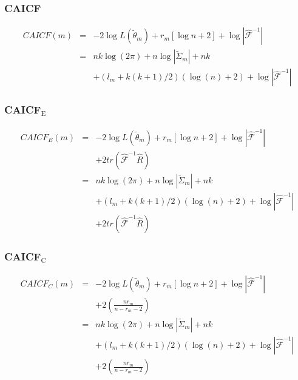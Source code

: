 \subsubsection{CAICF}

\begin{eqnarray*}
CAICF\left(m\right) & = & -2\log L\left(\widetilde{\theta}_{m}\right)+r_{m}\left[\log n+2\right]+\log\left\vert \hat{\mathcal{F}}^{-1}\right\vert \\
 & = & nk\log\left(2\pi\right)+n\log\left\vert \widetilde{\Sigma}_{m}\right\vert +nk\\
 &  & +\left(l_{m}+k\left(k+1\right)/2\right)\left(\log\left(n\right)+2\right)+\log\left\vert \hat{\mathcal{F}}^{-1}\right\vert 
\end{eqnarray*}



\subsubsection{CAICF$_{\text{E}}$}

\begin{eqnarray*}
CAICF_{E}\left(m\right) & = & -2\log L\left(\widetilde{\theta}_{m}\right)+r_{m}\left[\log n+2\right]+\log\left\vert \hat{\mathcal{F}}^{-1}\right\vert \\
 &  & +2tr\left(\hat{\mathcal{F}}^{-1}\hat{R}\right)\\
 & = & nk\log\left(2\pi\right)+n\log\left\vert \widetilde{\Sigma}_{m}\right\vert +nk\\
 &  & +\left(l_{m}+k\left(k+1\right)/2\right)\left(\log\left(n\right)+2\right)+\log\left\vert \hat{\mathcal{F}}^{-1}\right\vert \\
 &  & +2tr\left(\hat{\mathcal{F}}^{-1}\hat{R}\right)
\end{eqnarray*}



\subsubsection{CAICF$_{\text{C}}$}

\begin{eqnarray*}
CAICF_{C}\left(m\right) & = & -2\log L\left(\widetilde{\theta}_{m}\right)+r_{m}\left[\log n+2\right]+\log\left\vert \hat{\mathcal{F}}^{-1}\right\vert \\
 &  & +2\left(\frac{nr_{m}}{n-r_{m}-2}\right)\\
 & = & nk\log\left(2\pi\right)+n\log\left\vert \widetilde{\Sigma}_{m}\right\vert +nk\\
 &  & +\left(l_{m}+k\left(k+1\right)/2\right)\left(\log\left(n\right)+2\right)+\log\left\vert \hat{\mathcal{F}}^{-1}\right\vert \\
 &  & +2\left(\frac{nr_{m}}{n-r_{m}-2}\right)
\end{eqnarray*}



